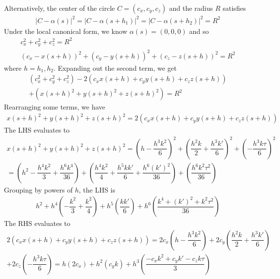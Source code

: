 \documentclass{article}
\begin{document}
	Alternatively, the center of the circle $C = (c_x, c_y, c_z)$ and the radius $R$ satisfies
	\begin{gather*}
		\left| C - \alpha(s) \right|^2 = \left| C - \alpha(s + h_1) \right|^2 = \left| C - \alpha(s + h_2) \right|^2 = R^2 
	\end{gather*}
	Under the local canonical form, we know $\alpha(s) = (0, 0, 0)$ and so
	\begin{gather*}
		c_x^2 + c_y^2 + c_z^2 = R^2 \\
		(c_x - x(s + h))^2 + (c_y - y(s + h))^2 + (c_z - z(s + h))^2 = R^2
	\end{gather*}
	where $h = h_1, h_2$. Expanding out the second term, we get
	\begin{gather*}
		\left( c_x^2 + c_y^2 + c_z^2 \right) - 2 \left( c_x x(s + h) + c_y y(s + h) + c_z z(s + h) \right) \\
		+ \left( x(s + h)^2 + y(s + h)^2 + z(s + h)^2 \right) = R^2
	\end{gather*}
	Rearranging some terms, we have
	\begin{gather*}
		x(s + h)^2 + y(s + h)^2 + z(s + h)^2 = 2 \left( c_x x(s + h) + c_y y(s + h) + c_z z(s + h) \right)
	\end{gather*}
	The LHS evaluates to
	\begin{gather*}
		x(s + h)^2 + y(s + h)^2 + z(s + h)^2 = \left( h - \dfrac{h^3 k^2}{6} \right)^2 + \left( \dfrac{h^2 k}{2} + \dfrac{h^3 k'}{6} \right)^2 + \left( - \dfrac{h^3 k \tau}{6} \right)^2 \\
		= \left( h^2 - \dfrac{h^4 k^2}{3} + \dfrac{h^6 k^4}{36} \right) + \left( \dfrac{h^4 k^2}{4} + \dfrac{h^5 k k'}{6} + \dfrac{h^6 (k')^2}{36} \right) + \left( \dfrac{h^6 k^2 \tau^2}{36} \right)
	\end{gather*}
	Grouping by powers of $h$, the LHS is
	\begin{gather*}
		h^2 + h^4 \left( - \dfrac{k^2}{3} + \dfrac{k^2}{4} \right) + h^5 \left( \dfrac{k k'}{6} \right) + h^6 \left( \dfrac{k^4 + (k')^2 + k^2 \tau^2}{36} \right)
	\end{gather*}
	The RHS evaluates to
	\begin{gather*}
		2 \left( c_x x(s + h) + c_y y(s + h) + c_z z(s + h) \right) = 2 c_x \left( h - \dfrac{h^3 k^2}{6} \right) + 2 c_y \left( \dfrac{h^2 k}{2} + \dfrac{h^3 k'}{6} \right) \\
		+ 2 c_z \left( - \dfrac{h^3 k \tau}{6} \right) = h \left( 2 c_x \right) + h^2 \left( c_y k \right) + h^3 \left( \dfrac{-c_x k^2 + c_y k' - c_z k \tau}{3} \right)
	\end{gather*}
\end{document}
